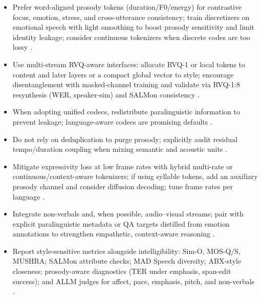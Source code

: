 \documentclass{article}
\begin{document}
\begin{itemize}
\item Prefer word-aligned prosody tokens (duration/F0/energy) for contrastive focus, emotion, stress, and cross-utterance consistency; train discretizers on emotional speech with light smoothing to boost prosody sensitivity and limit identity leakage; consider continuous tokenizers when discrete codes are too lossy \cite{qian2025prosodylmuncoveringemergingprosodyproces,onda2025benchmarkingprosodyencodingdiscretespeec,li2025continuousspeechtokenizertext}.
\item Use multi-stream RVQ-aware interfaces: allocate RVQ-1 or local tokens to content and later layers or a compact global vector to style; encourage disentanglement with masked-channel training and validate via RVQ-1:8 resynthesis (WER, speaker-sim) and SALMon consistency \cite{ji2025languagecodecbridgingdiscreterepresentat,maimon2025salmonsuiteacousticlanguagemodelevaluati,entry2025indicsuperbspeechprocessinguniversalperf}.
\item When adopting unified codecs, redistribute paralinguistic information to prevent leakage; language-aware codecs are promising defaults \cite{ji2025languagecodecbridgingdiscreterepresentat}.
\item Do not rely on deduplication to purge prosody; explicitly audit residual tempo/duration coupling when mixing semantic and acoustic units \cite{peng2024empiricalstudyspeechlanguagemodelsprompt}.
\item Mitigate expressivity loss at low frame rates with hybrid multi-rate or continuous/context-aware tokenizers; if using syllable tokens, add an auxiliary prosody channel and consider diffusion decoding; tune frame rates per language \cite{li2025continuousspeechtokenizertext,qian2025prosodylmuncoveringemergingprosodyproces,zhang2025impactframeratesspeechtokenizercasestudy,yang2025almtokenizerlowbitratesemanticrichaudioc,yang2025diffsoundstreamefficientspeechtokenizati}.
\item Integrate non-verbals and, when possible, audio--visual streams; pair with explicit paralinguistic metadata or QA targets distilled from emotion annotations to strengthen empathetic, context-aware reasoning \cite{har-tuv2025pastphoneticacousticspeechtokenizer,wang2025bossbeyondsemanticspeech,wang2025incorporatingcontextualparalinguisticund,mousavi2024howshouldweextractdiscreteaudiotokenssel}.
\item Report style-sensitive metrics alongside intelligibility: Sim-O, MOS-Q/S, MUSHRA; SALMon attribute checks; MAD Speech diversity; ABX-style closeness; prosody-aware diagnostics (TER under emphasis, span-edit success); and ALLM judges for affect, pace, emphasis, pitch, and non-verbals \cite{maimon2025salmonsuiteacousticlanguagemodelevaluati,futeral2025madspeechmeasuresacousticdiversity,fily2024establishingdegreesclosenessbetweenaudio,chiang2025audioawarelargelanguagemodelsasjudgesspe}.
\end{itemize}
\end{document}
